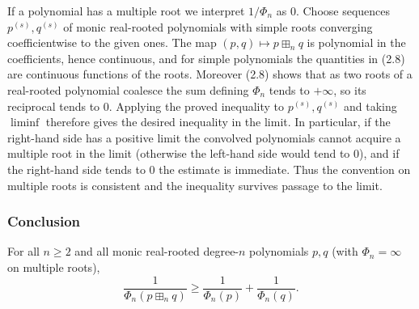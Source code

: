 \documentclass{article}
\begin{document}
If a polynomial has a multiple root we interpret $1/\Phi_n$ as $0$. Choose sequences $p^{(s)}, q^{(s)}$ of monic real-rooted polynomials with simple roots converging coefficientwise to the given ones. The map $(p,q) \mapsto p \boxplus_n q$ is polynomial in the coefficients, hence continuous, and for simple polynomials the quantities in (2.8) are continuous functions of the roots. Moreover (2.8) shows that as two roots of a real-rooted polynomial coalesce the sum defining $\Phi_n$ tends to $+\infty$, so its reciprocal tends to $0$. Applying the proved inequality to $p^{(s)}, q^{(s)}$ and taking $\liminf$ therefore gives the desired inequality in the limit. In particular, if the right-hand side has a positive limit the convolved polynomials cannot acquire a multiple root in the limit (otherwise the left-hand side would tend to $0$), and if the right-hand side tends to $0$ the estimate is immediate. Thus the convention on multiple roots is consistent and the inequality survives passage to the limit.

\subsubsection*{Conclusion}

For all $n \ge 2$ and all monic real-rooted degree-$n$ polynomials $p, q$ (with $\Phi_n = \infty$ on multiple roots),
\[
  \boxed{\frac{1}{\Phi_n(p \boxplus_n q)} \ge \frac{1}{\Phi_n(p)} + \frac{1}{\Phi_n(q)}.}
\]
\end{document}
